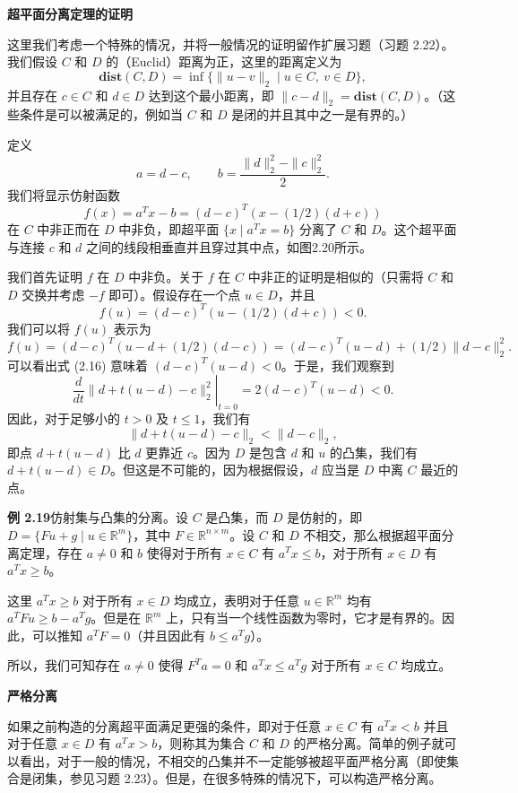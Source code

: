 \documentclass[UTF8, 12pt, fontset=fandol, oneside]{ctexart}
\begin{document}
\noindent\textbf{超平面分离定理的证明}

这里我们考虑一个特殊的情况，并将一般情况的证明留作扩展习题（习题 2.22）。我们假设 $C$ 和 $D$ 的（Euclid）距离为正，这里的距离定义为
\[
  \mathbf{dist}(C,D)=\inf\{\|u-v\|_2\mid u\in C,\ v\in D\},
\]
并且存在 $c\in C$ 和 $d\in D$ 达到这个最小距离，即 $\|c-d\|_2=\mathbf{dist}(C,D)$。（这些条件是可以被满足的，例如当 $C$ 和 $D$ 是闭的并且其中之一是有界的。）

定义
\[
  a=d-c,\qquad b=\frac{\|d\|_2^2-\|c\|_2^2}{2}.
\]
我们将显示仿射函数
\[
  f(x)=a^Tx-b=(d-c)^T(x-(1/2)(d+c))
\]
在 $C$ 中非正而在 $D$ 中非负，即超平面 $\{x\mid a^Tx=b\}$ 分离了 $C$ 和 $D$。这个超平面与连接 $c$ 和 $d$ 之间的线段相垂直并且穿过其中点，如图2.20所示。

我们首先证明 $f$ 在 $D$ 中非负。关于 $f$ 在 $C$ 中非正的证明是相似的（只需将 $C$ 和 $D$ 交换并考虑 $-f$ 即可）。假设存在一个点 $u\in D$，并且
\begin{equation}
  f(u)=(d-c)^T(u-(1/2)(d+c))<0.
  \tag{2.16}
\end{equation}
我们可以将 $f(u)$ 表示为
\[
  f(u)=(d-c)^T(u-d+(1/2)(d-c))=(d-c)^T(u-d)+(1/2)\|d-c\|_2^2.
\]
可以看出式 (2.16) 意味着 $(d-c)^T(u-d)<0$。于是，我们观察到
\[
  \left.\frac{d}{dt}\|d+t(u-d)-c\|_2^2\right|_{t=0}
  =2(d-c)^T(u-d)<0.
\]
因此，对于足够小的 $t>0$ 及 $t\le 1$，我们有
\[
  \|d+t(u-d)-c\|_2<\|d-c\|_2,
\]
即点 $d+t(u-d)$ 比 $d$ 更靠近 $c$。因为 $D$ 是包含 $d$ 和 $u$ 的凸集，我们有 $d+t(u-d)\in D$。但这是不可能的，因为根据假设，$d$ 应当是 $D$ 中离 $C$ 最近的点。

\noindent\textbf{例 2.19}\quad 仿射集与凸集的分离。设 $C$ 是凸集，而 $D$ 是仿射的，即 $D=\{Fu+g\mid u\in\mathbb{R}^m\}$，其中 $F\in\mathbb{R}^{n\times m}$。设 $C$ 和 $D$ 不相交，那么根据超平面分离定理，存在 $a\ne 0$ 和 $b$ 使得对于所有 $x\in C$ 有 $a^Tx\le b$，对于所有 $x\in D$ 有 $a^Tx\ge b$。

这里 $a^Tx\ge b$ 对于所有 $x\in D$ 均成立，表明对于任意 $u\in\mathbb{R}^m$ 均有 $a^TFu\ge b-a^Tg$。但是在 $\mathbb{R}^m$ 上，只有当一个线性函数为零时，它才是有界的。因此，可以推知 $a^TF=0$（并且因此有 $b\le a^Tg$）。

所以，我们可知存在 $a\ne 0$ 使得 $F^Ta=0$ 和 $a^Tx\le a^Tg$ 对于所有 $x\in C$ 均成立。

\noindent\textbf{严格分离}

如果之前构造的分离超平面满足更强的条件，即对于任意 $x\in C$ 有 $a^Tx<b$ 并且对于任意 $x\in D$ 有 $a^Tx>b$，则称其为集合 $C$ 和 $D$ 的严格分离。简单的例子就可以看出，对于一般的情况，不相交的凸集并不一定能够被超平面严格分离（即使集合是闭集，参见习题 2.23）。但是，在很多特殊的情况下，可以构造严格分离。
\end{document}
